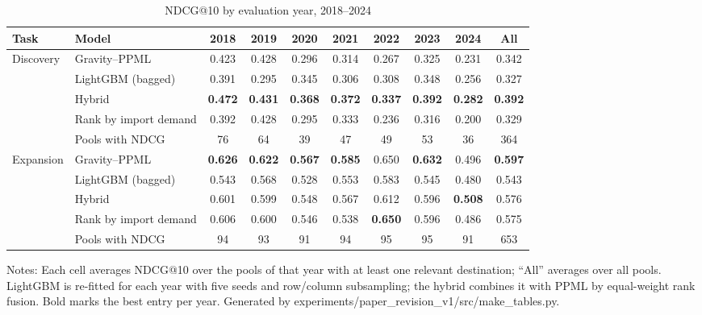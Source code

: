 \begin{table}[htbp]
\centering
\caption{NDCG@10 by evaluation year, 2018--2024}\label{tab:main_year}
\footnotesize
\begin{adjustbox}{max width=\textwidth}
\begin{tabular}{@{}llcccccccc@{}}
\toprule
Task & Model & 2018 & 2019 & 2020 & 2021 & 2022 & 2023 & 2024 & All \\
\midrule
Discovery & Gravity--PPML & 0.423 & 0.428 & 0.296 & 0.314 & 0.267 & 0.325 & 0.231 & 0.342 \\
 & LightGBM (bagged) & 0.391 & 0.295 & 0.345 & 0.306 & 0.308 & 0.348 & 0.256 & 0.327 \\
 & Hybrid & \textbf{0.472} & \textbf{0.431} & \textbf{0.368} & \textbf{0.372} & \textbf{0.337} & \textbf{0.392} & \textbf{0.282} & \textbf{0.392} \\
 & Rank by import demand & 0.392 & 0.428 & 0.295 & 0.333 & 0.236 & 0.316 & 0.200 & 0.329 \\
 & Pools with NDCG & 76 & 64 & 39 & 47 & 49 & 53 & 36 & 364 \\
\midrule
Expansion & Gravity--PPML & \textbf{0.626} & \textbf{0.622} & \textbf{0.567} & \textbf{0.585} & 0.650 & \textbf{0.632} & 0.496 & \textbf{0.597} \\
 & LightGBM (bagged) & 0.543 & 0.568 & 0.528 & 0.553 & 0.583 & 0.545 & 0.480 & 0.543 \\
 & Hybrid & 0.601 & 0.599 & 0.548 & 0.567 & 0.612 & 0.596 & \textbf{0.508} & 0.576 \\
 & Rank by import demand & 0.606 & 0.600 & 0.546 & 0.538 & \textbf{0.650} & 0.596 & 0.486 & 0.575 \\
 & Pools with NDCG & 94 & 93 & 91 & 94 & 95 & 95 & 91 & 653 \\
\bottomrule
\end{tabular}
\end{adjustbox}
\par\smallskip
\begin{minipage}{0.97\textwidth}\scriptsize
Notes: Each cell averages NDCG@10 over the pools of that year with at least one relevant destination; ``All'' averages over all pools. LightGBM is re-fitted for each year with five seeds and row/column subsampling; the hybrid combines it with PPML by equal-weight rank fusion. Bold marks the best entry per year. Generated by experiments/paper\_revision\_v1/src/make\_tables.py.
\end{minipage}
\end{table}
